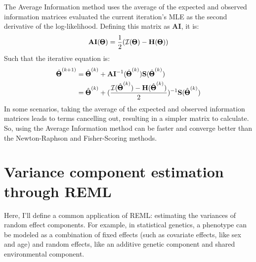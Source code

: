 \documentclass[12pt]{article}
\begin{document}
The Average Information method uses the average of the expected and observed information matrices evaluated the current iteration's MLE as the second derivative of the log-likelihood. Defining this matrix as $\mathbf{AI}$, it is:
$$
\mathbf{AI}(\pmb{\Theta}) = \frac{1}{2}
(\mathcal{I}(\pmb{\Theta}) - \mathbf{H}(\pmb{\Theta}))  
$$
Such that the iterative equation is:
\begin{align*}
\hat{\pmb{\Theta}}^{(k+1)} &= 
\hat{\pmb{\Theta}}^{(k)} +
\mathbf{AI}^{-1} (\hat{\pmb{\Theta}}^{(k)})
\mathbf{S}(\hat{\pmb{\Theta}}^{(k)}) \\
&= 
\hat{\pmb{\Theta}}^{(k)} +
(\frac{\mathcal{I}(\hat{\pmb{\Theta}}^{(k)}) -
\mathbf{H}(\hat{\pmb{\Theta}}^{(k)})}{2})^{-1}
\mathbf{S}(\hat{\pmb{\Theta}}^{(k)})
\end{align*}
In some scenarios, taking the average of the expected and observed information matrices leads to terms cancelling out, resulting in a simpler matrix to calculate.
So, using the Average Information method can be faster and converge better than the Newton-Raphson and Fisher-Scoring methods.

\section{Variance component estimation through REML}
Here, I'll define a common application of REML: estimating the variances of random effect components.
For example, in statistical genetics, a phenotype can be modeled as a combination of fixed effects (such as covariate effects, like sex and age) and random effects, like an additive genetic component and shared environmental component.
\end{document}

